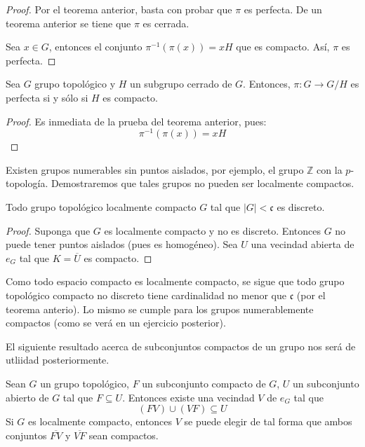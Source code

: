 \documentclass[12pt]{report}
\theoremstyle{largebreak}
\newcommand\abs[1]{\ensuremath{\left|#1\right|}}
\newcommand\cf[3]{\ensuremath{#1:#2\rightarrow#3}}
\newcommand{\Cls}[1]{\ensuremath{\overline{#1}}}
\begin{document}
    \begin{proof}
        Por el teorema anterior, basta con probar que $\pi$ es perfecta. De un teorema anterior se tiene que $\pi$ es cerrada.

        Sea $x\in G$, entonces el conjunto $\pi^{-1}(\pi(x))=xH$ que es compacto. Así, $\pi$ es perfecta.
    \end{proof}

    \begin{cor}
        Sea $G$ grupo topológico y $H$ un subgrupo cerrado de $G$. Entonces, $\cf{\pi}{G}{G/H}$ es perfecta si y sólo si $H$ es compacto.
    \end{cor}

    \begin{proof}
        Es inmediata de la prueba del teorema anterior, pues:
        \begin{equation*}
            \pi^{-1}(\pi(x))=xH
        \end{equation*}
    \end{proof}

    Existen grupos numerables sin puntos aislados, por ejemplo, el grupo $\mathbb{Z}$ con la $p$-topología. Demostraremos que tales grupos no pueden ser localmente compactos.

    \begin{theor}
        Todo grupo topológico localmente compacto $G$ tal que $\abs{G}<\mathfrak{c}$ es discreto.
    \end{theor}

    \begin{proof}
        Suponga que $G$ es localmente compacto y no es discreto. Entonces $G$ no puede tener puntos aislados (pues es homogéneo). Sea $U$ una vecindad abierta de $e_G$ tal que $K=\Cls{U}$ es compacto.
    \end{proof}

    Como todo espacio compacto es localmente compacto, se sigue que todo grupo topológico compacto no discreto tiene cardinalidad no menor que $\mathfrak{c}$ (por el teorema anterio). Lo mismo se cumple para los grupos numerablemente compactos (como se verá en un ejercicio posterior).

    El siguiente resultado acerca de subconjuntos compactos de un grupo nos será de utliidad posteriormente.

    \begin{theor}
        Sean $G$ un grupo topológico, $F$ un subconjunto compacto de $G$, $U$ un subconjunto abierto de $G$ tal que $F\subseteq U$. Entonces existe una vecindad $V$ de $e_G$ tal que
        \begin{equation*}
            (FV)\cup(VF)\subseteq U
        \end{equation*}
        Si $G$ es localmente compacto, entonces $V$ se puede elegir de tal forma que ambos conjuntos $\Cls{FV}$ y $\Cls{VF}$ sean compactos.
    \end{theor}
\end{document}
